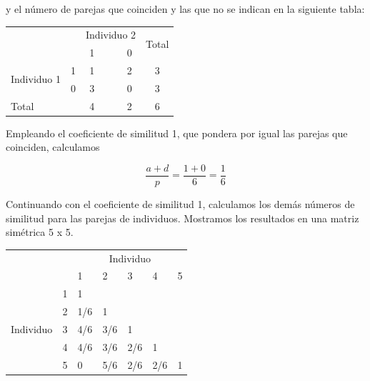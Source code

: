 \documentclass[a4paper, 20pt]{article}
\begin{document}
y el número de parejas que coinciden y las que no se indican en la siguiente tabla:

\begin{table}[h]
\centering
\resizebox{6.5cm}{!} {
\begin{tabular}{ll|clc|c|l}
\multicolumn{2}{l|}{\multirow{2}{*}{}} & \multicolumn{3}{c}{Individuo 2} & \multicolumn{2}{c|}{\multirow{2}{*}{Total}} \\
\multicolumn{2}{l|}{}                  & 1        &       & 0       & \multicolumn{2}{c|}{}                        \\ \hline
\multirow{2}{*}{Individuo 1}       & 1      & 1        &       & 2       & \multicolumn{2}{c|}{3}                     \\
                              & 0      & 3        &       & 0       & \multicolumn{2}{c|}{3}                     \\ \hline
\multicolumn{2}{l|}{Total}            & 4      &       & 2     & \multicolumn{2}{c|}{6}              
\end{tabular}
}
\end{table}

Empleando el coeficiente de similitud 1, que pondera por igual las parejas que coinciden, calculamos

$$\frac{a+d}{p}=\frac{1+0}{6}=\frac{1}{6} $$

Continuando con el coeficiente de similitud 1, calculamos los demás números de similitud para las parejas de individuos. Mostramos los resultados en una matriz simétrica 5 x 5.

\begin{table}[h]
\centering
\resizebox{7.5cm}{!} {
\begin{tabular}{lllllll}
\multicolumn{2}{l}{\multirow{2}{*}{}}               & \multicolumn{5}{c}{Individuo}                  \\
\multicolumn{2}{l}{}                                & 1   & 2   & 3   & 4   & 5                      \\ \cline{3-3} \cline{7-7} 
\multirow{5}{*}{Individuo} & \multicolumn{1}{l|}{1} & 1   &     &     &     & \multicolumn{1}{l|}{}  \\
                           & \multicolumn{1}{l|}{2} & 1/6 & 1   &     &     & \multicolumn{1}{l|}{}  \\
                           & \multicolumn{1}{l|}{3} & 4/6 & 3/6 & 1   &     & \multicolumn{1}{l|}{}  \\
                           & \multicolumn{1}{l|}{4} & 4/6 & 3/6 & 2/6 & 1   & \multicolumn{1}{l|}{}  \\
                           & \multicolumn{1}{l|}{5} & 0   & 5/6 & 2/6 & 2/6 & \multicolumn{1}{l|}{1} \\ \cline{3-3} \cline{7-7} 
\end{tabular}
}
\end{table}
\end{document}
